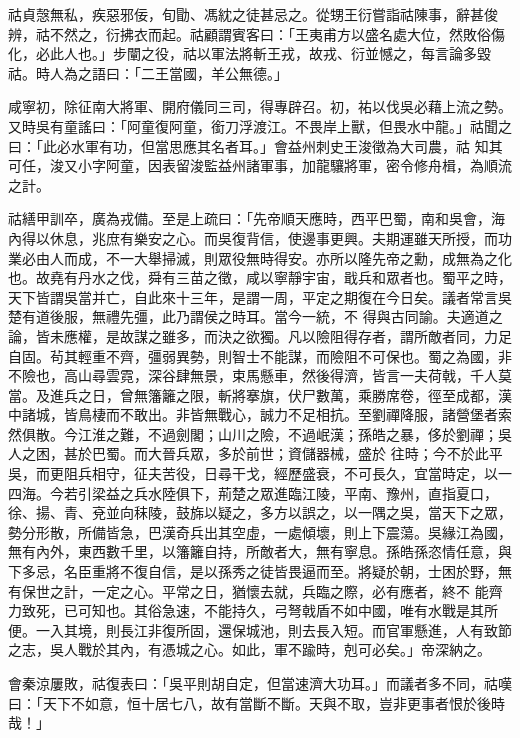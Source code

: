 \begin{pinyinscope}
 祜貞愨無私，疾惡邪佞，旬勖、馮紞之徒甚忌之。從甥王衍嘗詣祜陳事，辭甚俊辨，祜不然之，衍拂衣而起。祜顧謂賓客曰：「王夷甫方以盛名處大位，然敗俗傷化，必此人也。」步闡之役，祜以軍法將斬王戎，故戎、衍並憾之，每言論多毀祜。時人為之語曰：「二王當國，羊公無德。」



 咸寧初，除征南大將軍、開府儀同三司，得專辟召。初，祐以伐吳必藉上流之勢。又時吳有童謠曰：「阿童復阿童，銜刀浮渡江。不畏岸上獸，但畏水中龍。」祜聞之曰：「此必水軍有功，但當思應其名者耳。」會益州刺史王浚徵為大司農，祜
 知其可任，浚又小字阿童，因表留浚監益州諸軍事，加龍驤將軍，密令修舟楫，為順流之計。



 祜繕甲訓卒，廣為戎備。至是上疏曰：「先帝順天應時，西平巴蜀，南和吳會，海內得以休息，兆庶有樂安之心。而吳復背信，使邊事更興。夫期運雖天所授，而功業必由人而成，不一大舉掃滅，則眾役無時得安。亦所以隆先帝之勳，成無為之化也。故堯有丹水之伐，舜有三苗之徵，咸以寧靜宇宙，戢兵和眾者也。蜀平之時，天下皆謂吳當并亡，自此來十三年，是謂一周，平定之期復在今日矣。議者常言吳楚有道後服，無禮先彊，此乃謂侯之時耳。當今一統，不
 得與古同諭。夫適道之論，皆未應權，是故謀之雖多，而決之欲獨。凡以險阻得存者，謂所敵者同，力足自固。茍其輕重不齊，彊弱異勢，則智士不能謀，而險阻不可保也。蜀之為國，非不險也，高山尋雲霓，深谷肆無景，束馬懸車，然後得濟，皆言一夫荷戟，千人莫當。及進兵之日，曾無籓籬之限，斬將搴旗，伏尸數萬，乘勝席卷，徑至成都，漢中諸城，皆鳥棲而不敢出。非皆無戰心，誠力不足相抗。至劉禪降服，諸營堡者索然俱散。今江淮之難，不過劍閣；山川之險，不過岷漢；孫皓之暴，侈於劉禪；吳人之困，甚於巴蜀。而大晉兵眾，多於前世；資儲器械，盛於
 往時；今不於此平吳，而更阻兵相守，征夫苦役，日尋干戈，經歷盛衰，不可長久，宜當時定，以一四海。今若引梁益之兵水陸俱下，荊楚之眾進臨江陵，平南、豫州，直指夏口，徐、揚、青、兗並向秣陵，鼓旆以疑之，多方以誤之，以一隅之吳，當天下之眾，勢分形散，所備皆急，巴漢奇兵出其空虛，一處傾壞，則上下震蕩。吳緣江為國，無有內外，東西數千里，以籓籬自持，所敵者大，無有寧息。孫皓孫恣情任意，與下多忌，名臣重將不復自信，是以孫秀之徒皆畏逼而至。將疑於朝，士困於野，無有保世之計，一定之心。平常之日，猶懷去就，兵臨之際，必有應者，終不
 能齊力致死，已可知也。其俗急速，不能持久，弓弩戟盾不如中國，唯有水戰是其所便。一入其境，則長江非復所固，還保城池，則去長入短。而官軍懸進，人有致節之志，吳人戰於其內，有憑城之心。如此，軍不踰時，剋可必矣。」帝深納之。



 會秦涼屢敗，祜復表曰：「吳平則胡自定，但當速濟大功耳。」而議者多不同，祜嘆曰：「天下不如意，恒十居七八，故有當斷不斷。天與不取，豈非更事者恨於後時哉！」




\end{pinyinscope}
